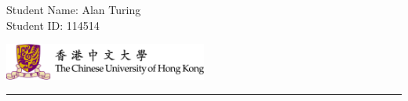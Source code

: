 \documentclass[11pt,letterpaper]{article}
\begin{document}
\pagestyle{plain}

\begin{flushleft}
\quad Student Name: Alan Turing\\
\quad Student ID: 114514
\end{flushleft}

\begin{flushright}\vspace{-15mm}
\includegraphics[height=1.2cm]{cuhk_logo_2x.png}
\end{flushright}
 

 
\rule{\linewidth}{0.1mm}

\bigskip
\bigskip
\end{document}
